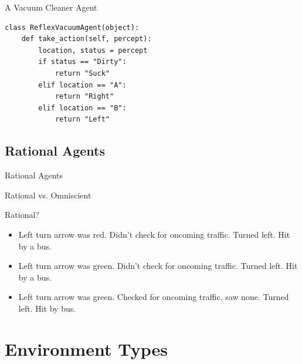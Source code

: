 \documentclass[14pt]{beamer}
\begin{document}
\begin{frame}[fragile]{A Vacuum Cleaner Agent}
\begin{lstlisting}
class ReflexVacuumAgent(object):
    def take_action(self, percept):
        location, status = percept
        if status == "Dirty":
            return "Suck"
        elif location == "A":
            return "Right"
        elif location == "B":
            return "Left"
\end{lstlisting}
\end{frame}

\subsection{Rational Agents}

\begin{frame}{Rational Agents}
\end{frame}

\begin{frame}{Rational vs. Omniscient}
\begin{block}{Rational?}
\begin{itemize}
\item Left turn arrow was red. Didn't check for oncoming traffic. Turned left. Hit by a bus.
\pause
\item Left turn arrow was green. Didn't check for oncoming traffic. Turned left. Hit by a bus.
\pause
\item Left turn arrow was green. Checked for oncoming traffic, saw none. Turned left. Hit by bus.
\end{itemize}
\end{block}
\end{frame}

\section{Environment Types}
\end{document}
